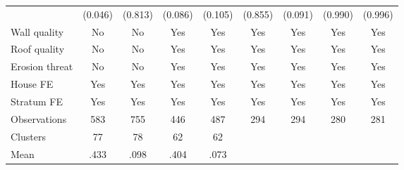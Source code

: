 {\begin{tabular}{l*{8}{c}}
                &  (0.046)         &  (0.813)         &  (0.086)         &  (0.105)         &  (0.855)         &  (0.091)         &  (0.990)         &  (0.996)         \\
Wall quality    &       No         &       No         &      Yes         &      Yes         &      Yes         &      Yes         &      Yes         &      Yes         \\
Roof quality    &       No         &       No         &      Yes         &      Yes         &      Yes         &      Yes         &      Yes         &      Yes         \\
Erosion threat  &       No         &       No         &      Yes         &      Yes         &      Yes         &      Yes         &      Yes         &      Yes         \\
House FE        &      Yes         &      Yes         &      Yes         &      Yes         &      Yes         &      Yes         &      Yes         &      Yes         \\
Stratum FE      &      Yes         &      Yes         &      Yes         &      Yes         &      Yes         &      Yes         &      Yes         &      Yes         \\
\hline
Observations    &      583         &      755         &      446         &      487         &      294         &      294         &      280         &      281         \\
Clusters        &       77         &       78         &       62         &       62         &                  &                  &                  &                  \\
Mean            &     .433         &     .098         &     .404         &     .073         &                  &                  &                  &                  \\
\hline\hline
\end{tabular}
}
